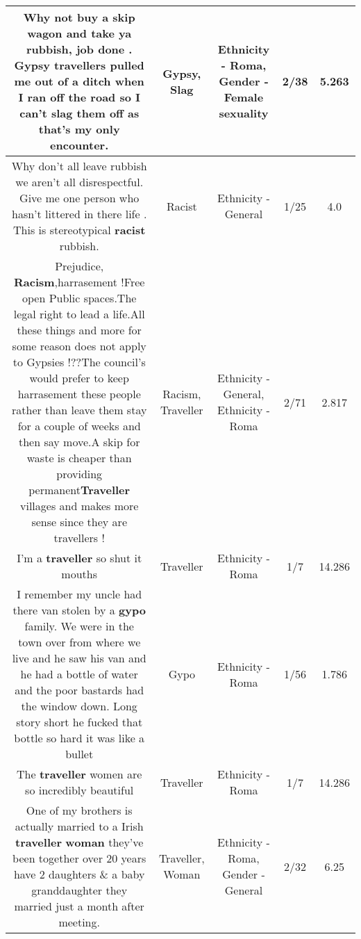 \documentclass[11pt]{article}
\newlength\mylength
\begin{document}
\begin{center}
\begin{longtable}{|C{.65\mylength}|C{.30\mylength}|C{.12\mylength}|C{.12\mylength}|C{.12\mylength}|}
  \small Why not buy a skip wagon and take ya rubbish, job done . \textbf{Gypsy} travellers pulled me out of a ditch when I ran off the road so I can't \textbf{slag} them off as that's my only encounter.\normalsize   & Gypsy, Slag & Ethnicity - Roma, Gender - Female sexuality & 2/38 & 5.263 \\  \hline
  \small Why don't all leave rubbish we aren't all disrespectful. Give me one person who hasn't  littered in there life . This is stereotypical \textbf{racist} rubbish.\normalsize   & Racist & Ethnicity - General & 1/25 & 4.0 \\  \hline
  \small Prejudice, \textbf{Racism},harrasement !Free open Public spaces.The legal right to lead a life.All these things and more for some reason does not apply to Gypsies !??The council's would prefer to keep harrasement these people rather than leave them stay for a couple of weeks and then say move.A skip for waste is cheaper than providing permanent\textbf{Traveller} villages and makes more sense since they are travellers !\normalsize   & Racism, Traveller & Ethnicity - General, Ethnicity - Roma & 2/71 & 2.817 \\  \hline
  \small I'm a \textbf{traveller} so shut it mouths\normalsize   & Traveller & Ethnicity - Roma & 1/7 & 14.286 \\  \hline
  \small I remember my uncle had there van stolen by a \textbf{gypo} family. We were in the town over from where we live and he saw his van and he had a bottle of water and the poor bastards had the window down. Long story short he fucked that bottle so hard it was like a bullet\normalsize   & Gypo & Ethnicity - Roma & 1/56 & 1.786 \\  \hline
  \small The \textbf{traveller} women are so incredibly beautiful\normalsize   & Traveller & Ethnicity - Roma & 1/7 & 14.286 \\  \hline
  \small One of my brothers is actually married to a Irish \textbf{traveller} \textbf{woman} they've been together over 20 years have 2 daughters \& a baby granddaughter they married just a month after meeting.\normalsize   & Traveller, Woman & Ethnicity - Roma, Gender - General & 2/32 & 6.25 \\  \hline

\end{longtable}
\end{center}
\end{document}
